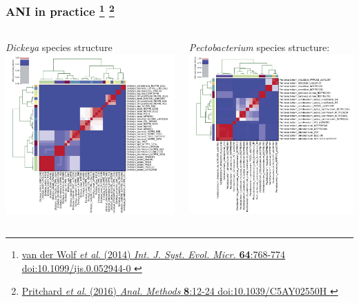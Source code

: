 \begin{frame}
  \frametitle{ANI in practice
    \footnote{\tiny{\href{http://dx.doi.org/10.1099/ijs.0.052944-0}{van der Wolf \textit{et al}. (2014) \textit{Int. J. Syst. Evol. Micr.} \textbf{64}:768-774 doi:10.1099/ijs.0.052944-0
    }}}
    \footnote{\tiny{\href{http://dx.doi.org/10.1039/C5AY02550H}{Pritchard \textit{et al}. (2016) \textit{Anal. Methods} \textbf{8}:12-24 doi:10.1039/C5AY02550H
    }}}
    }
  \begin{columns}[T]
    \begin{column}{5cm}
    \textit{Dickeya} species structure \\
      \includegraphics[width=\textwidth]{images/ANIm_dickeya}
    \end{column}
    \begin{column}{5cm}
    \textit{Pectobacterium} species structure:\\
      \includegraphics[width=\textwidth]{images/ANIm_pecto}

\end{column}
\end{columns}
\end{frame}
